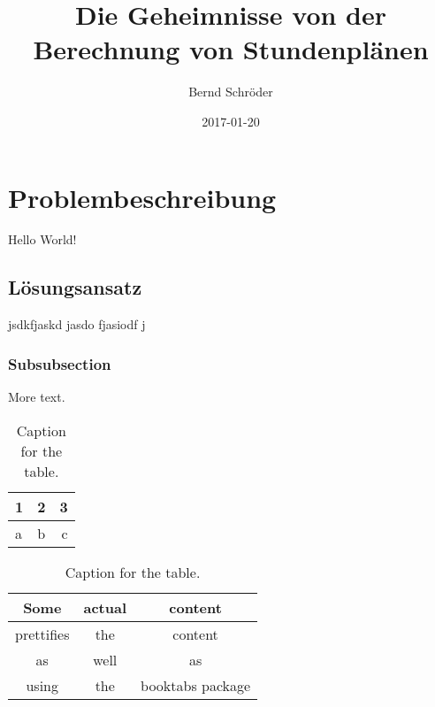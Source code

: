 \documentclass{article}
\title{Die Geheimnisse von der Berechnung von Stundenplänen}
\date{2017-01-20}
\author{Bernd Schröder}
\begin{document}
\maketitle
\newpage
{}

\section{Problembeschreibung}
Hello World!

\subsection{Lösungsansatz}
jsdkfjaskd jasdo fjasiodf j

\subsubsection{Subsubsection}

More text.

\begin{table}[h!]
  \centering
  \caption{Caption for the table.}
  \label{tab:table1}
  \begin{tabular}{l|c||r}
    1 & 2 & 3\\
    \hline
    a & b & c\\
  \end{tabular}
\end{table}

\begin{table}[h!]
  \centering
  \caption{Caption for the table.}
  \label{tab:table1}
  \begin{tabular}{ccc}
    \toprule
    Some & actual & content\\
    \midrule
    prettifies & the & content\\
    as & well & as\\
    using & the & booktabs package\\
    \bottomrule
  \end{tabular}
\end{table}
\end{document}
